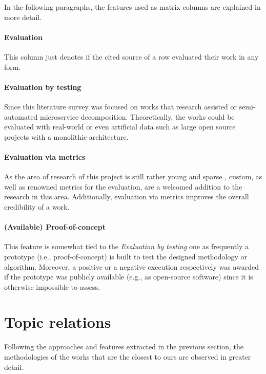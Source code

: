 \documentclass[12pt,a4paper]{report}
\begin{document}
In the following paragraphs, the features used as matrix columns are explained
in more detail.

\paragraph{Evaluation}
This column just denotes if the cited
source of a row evaluated their work in any form.

\paragraph{Evaluation by testing}
Since this literature survey was focused on works that research
assisted or semi-automated microservice decomposition. Theoretically, the works
could be evaluated with real-world or even artificial data such as large open
source projects with a monolithic architecture.

\paragraph{Evaluation via metrics}
As the area of research of this project is still rather young and
sparse \cite{jin2018functionality, fritzsch2018monolith}, custom, as well
as renowned metrics for the evaluation, are a welcomed addition to the research
in this area. Additionally, evaluation via metrics improves the overall
credibility of a work.

\paragraph{(Available) Proof-of-concept}
This feature is somewhat tied to the \textit{Evaluation by testing} one as
frequently a prototype (i.e., proof-of-concept) is built to test
the designed methodology or algorithm.
Moreover, a positive or a negative execution respectively was
awarded if the prototype was publicly available (e.g., as open-source software)
since it is otherwise impossible to assess.



\section{Topic relations} \label{subsect:topic-relations}

Following the approaches and features extracted in the previous section, the
methodologies of the works that are the closest to ours are observed in greater
detail.
\end{document}
